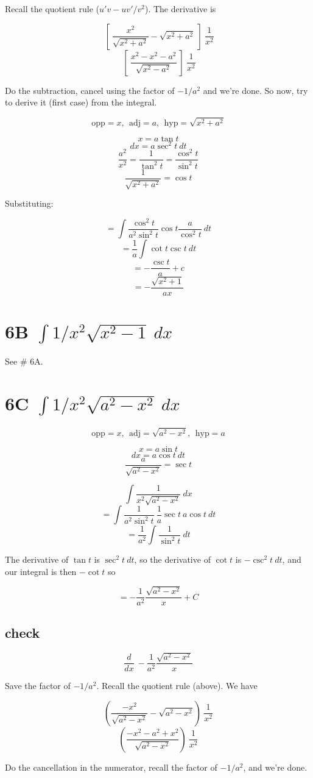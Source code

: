 \documentclass[11pt, oneside]{article}
\begin{document}
Recall the quotient rule ($u'v - uv' / v^2$).  The derivative is

\[ \ [ \ \frac{x^2}{\sqrt{x^2 + a^2}} - \sqrt{x^2 + a^2} \ ] \ \frac{1}{x^2} \]
\[ \ [ \ \frac{x^2 - x^2 - a^2}{\sqrt{x^2 - a^2}}  \ ] \ \frac{1}{x^2} \]

Do the subtraction, cancel using the factor of $-1/a^2$ and we're done.
So now, try to derive it (first case) from the integral.

\[ \text{opp} = x, \ \ \text{adj} = a, \ \ \text{hyp} = \sqrt{x^2 + a^2}   \]

\[ x =  a \tan t \]
\[ dx = a \sec^2 t \ dt \]
\[ \frac{a^2}{x^2} = \frac{1}{\tan^2 t} = \frac{\cos^2 t}{\sin^2 t} \]
\[ \frac{1}{\sqrt{x^2 + a^2}} = \cos t \]

Substituting:

\[ = \int \frac{ \cos^2 t}{a^2 \sin^2 t} \cos t \frac{a}{\cos^2 t}  \ dt \]
\[ = \frac{1}{a} \int \cot t \csc t \ dt \]
\[ = - \frac{\csc t}{a} + c \]
\[ = - \frac{\sqrt{x^2 + 1} }{ax} \]

\section*{6B $\int 1/x^2 \sqrt{x^2 - 1} \ dx$}

See \# 6A.

\section*{6C $\int 1/x^2 \sqrt{a^2 - x^2} \ dx$}

\[ \text{opp} = x, \ \ \text{adj} = \sqrt{a^2-x^2}, \ \ \text{hyp} = a   \]

\[ x = a \sin t \]
\[ dx = a \cos t \ dt \]
\[ \frac{a}{\sqrt{a^2-x^2}} = \sec t \]

\[ \int \frac{1}{x^2 \sqrt{a^2 - x^2}} \ dx \]
\[ = \int \frac{1}{a^2 \sin^2 t } \ \frac{1}{a} \sec t \ a \cos t \ dt \]
\[ = \frac{1}{a^2} \int \frac{1}{\sin^2 t} \ dt \]

The derivative of $\tan t$ is $\sec^2 t \ dt$, so the derivative of $\cot t$ is $- \csc^2 t \ dt$, and our integral is then $- \cot t$ so

\[ = - \frac{1}{a^2} \frac{\sqrt{a^2 - x^2}}{x} + C\]

\subsection*{check}

\[ \frac{d}{dx} \ - \frac{1}{a^2} \frac{\sqrt{a^2 - x^2}}{x} \]

Save the factor of $-1/a^2$.  Recall the quotient rule (above).  We have

\[  ( \frac{-x^2}{\sqrt{a^2-x^2}} - \sqrt{a^2-x^2} ) \ \frac{1}{x^2} \]
\[  ( \frac{-x^2 - a^2 + x^2}{\sqrt{a^2-x^2}}  ) \ \frac{1}{x^2} \]

Do the cancellation in the numerator, recall the factor of $-1/a^2$, and we're done.
\end{document}
